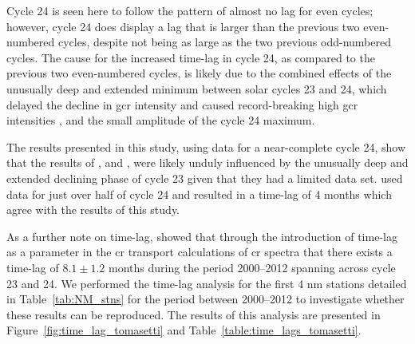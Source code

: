 Cycle 24 is seen here to follow the pattern of almost no lag for even cycles; however, cycle 24 does display a lag that is larger than the previous two even-numbered cycles, despite not being as large as the two previous odd-numbered cycles. The cause for the increased time-lag in cycle 24, as compared to the previous two even-numbered cycles, is likely due to the combined effects of the unusually deep and extended minimum between solar cycles 23 and 24, which delayed the decline in \gls{gcr} intensity and caused record-breaking high \gls{gcr} intensities \citep{pacini_unusual_2015}, and the small amplitude of the cycle 24 maximum.

The results presented in this study, using data for a near-complete cycle 24, show that the results of \cite{kane_lags_2014}, and \cite{mishra_study_2016}, were likely unduly influenced by the unusually deep and extended declining phase of cycle 23 given that they had a limited data set. \cite{mishra_study_2016} used data for just over half of cycle 24 and resulted in a time-lag of 4 months which agree with the results of this study.

As a further note on time-lag, \cite{tomassetti_evidence_2017} showed that through the introduction of time-lag as a parameter in the \gls{cr} transport calculations of \gls{cr} spectra that there exists a time-lag of $8.1 \pm 1.2$ months during the period 2000--2012 spanning across cycle 23 and 24. We performed the time-lag analysis for the first 4 \gls{nm} stations detailed in Table~\ref{tab:NM_stns} for the period between 2000--2012 to investigate whether these results can be reproduced. The results of this analysis are presented in Figure~\ref{fig:time_lag_tomasetti} and Table~\ref{table:time_lags_tomasetti}.


